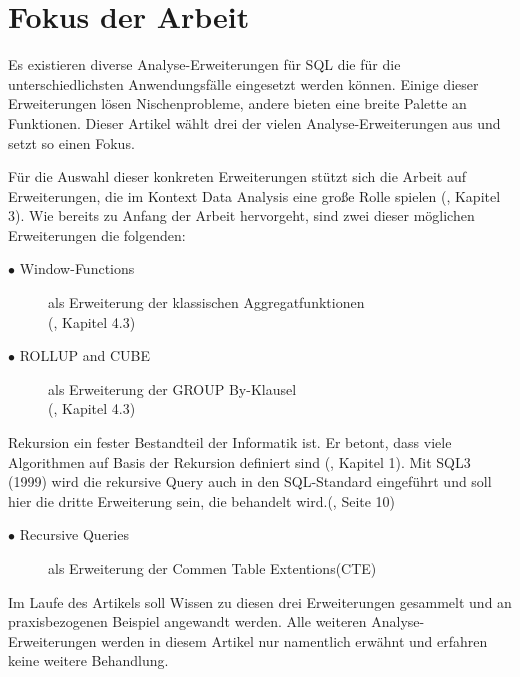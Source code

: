 \section{Fokus der Arbeit}
Es existieren diverse Analyse-Erweiterungen für SQL die für die unterschiedlichsten
Anwendungsfälle eingesetzt werden können. Einige dieser Erweiterungen lösen
Nischenprobleme, andere bieten eine breite Palette an Funktionen. Dieser Artikel
wählt drei der vielen Analyse-Erweiterungen aus und setzt so einen Fokus.

Für die Auswahl dieser konkreten Erweiterungen stützt sich die Arbeit auf
Erweiterungen, die im Kontext Data Analysis eine große Rolle spielen (\cite{FOTACHE2015243},
Kapitel 3). Wie bereits zu Anfang der Arbeit hervorgeht, sind zwei dieser
möglichen Erweiterungen die folgenden:

\begin{description}
	\item[$\bullet$ Window-Functions] als Erweiterung der klassischen Aggregatfunktionen
		\\ (\cite{FOTACHE2015243}, Kapitel 4.3)

	\item[$\bullet$ ROLLUP and CUBE] als Erweiterung der GROUP By-Klausel \\ (\cite{FOTACHE2015243},
		Kapitel 4.3)
\end{description}

Rekursion ein fester Bestandteil der Informatik ist. Er betont, dass viele Algorithmen
auf Basis der Rekursion definiert sind (\cite{4460710}, Kapitel 1). Mit SQL3 (1999)
wird die rekursive Query auch in den SQL-Standard eingeführt und soll hier die dritte
Erweiterung sein, die behandelt wird.(\cite{grust2017advanced}, Seite 10)

\begin{description}
	\item[$\bullet$ Recursive Queries] als Erweiterung der Commen Table Extentions(CTE)
\end{description}

Im Laufe des Artikels soll Wissen zu diesen drei Erweiterungen gesammelt und an praxisbezogenen
Beispiel angewandt werden. Alle weiteren Analyse-Erweiterungen werden in diesem
Artikel nur namentlich erwähnt und erfahren keine weitere Behandlung.